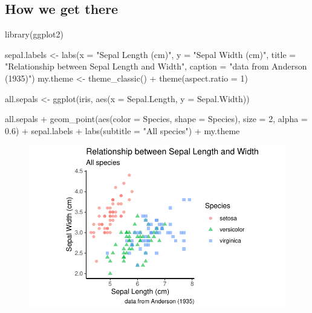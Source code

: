 \documentclass[
  letterpaper,
  DIV=11,
  numbers=noendperiod]{scrartcl}
\newenvironment{Shaded}{\begin{snugshade}}{\end{snugshade}}
\newcommand{\AttributeTok}[1]{\textcolor[rgb]{0.40,0.45,0.13}{#1}}
\newcommand{\DecValTok}[1]{\textcolor[rgb]{0.68,0.00,0.00}{#1}}
\newcommand{\FloatTok}[1]{\textcolor[rgb]{0.68,0.00,0.00}{#1}}
\newcommand{\FunctionTok}[1]{\textcolor[rgb]{0.28,0.35,0.67}{#1}}
\newcommand{\NormalTok}[1]{\textcolor[rgb]{0.00,0.23,0.31}{#1}}
\newcommand{\OtherTok}[1]{\textcolor[rgb]{0.00,0.23,0.31}{#1}}
\newcommand{\SpecialCharTok}[1]{\textcolor[rgb]{0.37,0.37,0.37}{#1}}
\newcommand{\StringTok}[1]{\textcolor[rgb]{0.13,0.47,0.30}{#1}}
\begin{document}
\hypertarget{how-we-get-there-2}{%
\subsection{How we get there}\label{how-we-get-there-2}}

\begin{Shaded}
\begin{Highlighting}[]
\FunctionTok{library}\NormalTok{(ggplot2)}


\NormalTok{sepal.labels }\OtherTok{\textless{}{-}} \FunctionTok{labs}\NormalTok{(}\AttributeTok{x =} \StringTok{"Sepal Length (cm)"}\NormalTok{, }\AttributeTok{y =} \StringTok{"Sepal Width (cm)"}\NormalTok{,}
                     \AttributeTok{title =} \StringTok{"Relationship between Sepal Length and Width"}\NormalTok{,}
                     \AttributeTok{caption =} \StringTok{"data from Anderson (1935)"}\NormalTok{)}
\NormalTok{my.theme }\OtherTok{\textless{}{-}} \FunctionTok{theme\_classic}\NormalTok{()  }\SpecialCharTok{+} \FunctionTok{theme}\NormalTok{(}\AttributeTok{aspect.ratio =} \DecValTok{1}\NormalTok{)}

\NormalTok{all.sepals }\OtherTok{\textless{}{-}} \FunctionTok{ggplot}\NormalTok{(iris, }\FunctionTok{aes}\NormalTok{(}\AttributeTok{x =}\NormalTok{ Sepal.Length, }\AttributeTok{y =}\NormalTok{ Sepal.Width))}

\NormalTok{all.sepals }\SpecialCharTok{+} 
  \FunctionTok{geom\_point}\NormalTok{(}\FunctionTok{aes}\NormalTok{(}\AttributeTok{color =}\NormalTok{ Species, }\AttributeTok{shape =}\NormalTok{ Species), }\AttributeTok{size =} \DecValTok{2}\NormalTok{, }\AttributeTok{alpha =} \FloatTok{0.6}\NormalTok{) }\SpecialCharTok{+}
\NormalTok{  sepal.labels }\SpecialCharTok{+} \FunctionTok{labs}\NormalTok{(}\AttributeTok{subtitle =} \StringTok{"All species"}\NormalTok{) }\SpecialCharTok{+}
\NormalTok{  my.theme}
\end{Highlighting}
\end{Shaded}

\begin{figure}[H]

{\centering \includegraphics{Week1Lecture2_files/figure-pdf/unnamed-chunk-2-1.pdf}

}

\end{figure}
\end{document}
